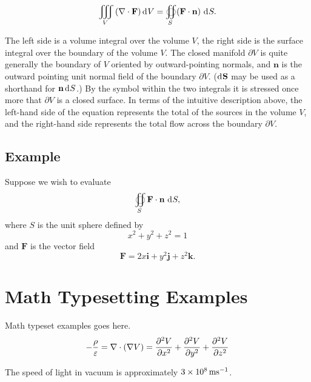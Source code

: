 \documentclass{cgdrepen}
\begin{document}
\begin{equation}
  \iiint_V\left(\mathbf{\nabla}\cdot\mathbf{F}\right) \diff V =
  \oiint_S(\mathbf{F}\cdot\mathbf{n})\,\diff S.
\end{equation}

The left side is a volume integral over the volume $V$,
the right side is the surface integral over the boundary of the volume $V$.
The closed manifold $\partial V$ is quite generally the boundary of $V$
oriented by outward-pointing normals, and $\mathbf{n}$ is the outward pointing 
unit normal field of the boundary $\partial V$. 
($\diff \mathbf{S}$ may be used as a shorthand for $\mathbf{n} \diff S$.)
By the symbol within the two integrals it is stressed once more that $\partial V$
is a closed surface.
In terms of the intuitive description above, the left-hand side of the 
equation represents the total of the sources in the volume $V$, 
and the right-hand side represents the total flow across the boundary $\partial V$.

\section{Example}

Suppose we wish to evaluate
\begin{equation}
  \oiint_S \mathbf{F}\cdot\mathbf{n} \, \diff S,
\end{equation}
where $S$ is the unit sphere defined by
\begin{equation}
   x^2+y^2+z^2=1
\end{equation}
and $\mathbf{F}$ is the vector field
\begin{equation}
  \mathbf{F} = 2 x\mathbf{i} + y^2\mathbf{j} + z ^2\mathbf{k}.
\end{equation}

\appendix
\chapter{Math Typesetting Examples}

Math typeset examples goes here.
\begin{equation}
  - \frac{\rho}{\varepsilon} = \nabla\cdot \left(\nabla V\right) = \pDeriv[2]{V}{x} + \pDeriv[2]{V}{y} + \pDeriv[2]{V}{z}
\end{equation}

The speed of light in vacuum is approximately $\unit[3\times10^8]{m s^{-1}}$.





\backmatter
\end{document}
